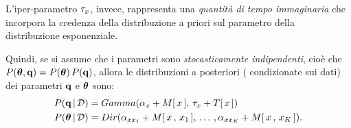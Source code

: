 \begin{notas}
L'iper-parametro $\tau_{\mathnormal{x}}$, invece, rappresenta una \emph{quantità di tempo immaginaria} che incorpora la credenza della distribuzione a priori sul parametro della distribuzione esponenziale.
\end{notas}
Quindi, se si assume che i parametri sono \emph{stocasticamente indipendenti}, cioè che $P(\boldsymbol{\textbf{\text{$\theta$}}},\boldsymbol{\textbf{\text{q}}})=P(\boldsymbol{\textbf{\text{$\theta$}}})\,P(\boldsymbol{\textbf{\text{q}}})$, allora le distribuzioni a posteriori (\ie{} condizionate sui dati) dei parametri $\boldsymbol{\textbf{\text{q}}}$ e $\boldsymbol{\textbf{\text{$\theta$}}}$ sono:
\begin{equation}\label{eq:ctbn-bayesian-params-posteriors}
\begin{aligned}
P(\param{q}\,\arrowvert\,\conceptsym{D})&=Gamma(\alpha_{\setel{x}}+\mstat{x},\,\tau_{\setel{x}}+\tstat{x}) \\
P(\param{$\theta$}\,\arrowvert\,\conceptsym{D})&=Dir(\alpha_{\setel{x}\setel{x}_1}+\mstat[x]{\setel{x}_1},\,\dotsc\,,\alpha_{\setel{x}\setel{x}_K}+\mstat[x]{\setel{x}_K})\text{.}
\end{aligned}
\end{equation}

